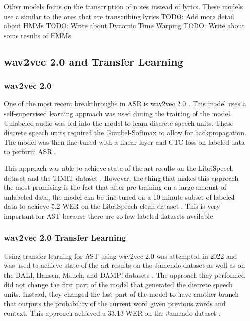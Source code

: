 \documentclass[letterpaper, 12pt]{article}
\begin{document}
\begin{multicols*}{2}
{
\color{red}
Other models focus on the transcription of notes instead of lyrics. These models use a similar
to the ones that are transcribing lyrics
TODO: Add more detail about HMMs
TODO: Write about Dynamic Time Warping
TODO: Write about some results of HMMs
}


\subsection{wav2vec 2.0 and Transfer Learning} \label{sec:wav2vec}

\subsubsection{wav2vec 2.0}
One of the most recent breakthroughs in ASR is wav2vec 2.0 \citep{wav2vec}. This model uses a
self-supervised learning approach was used during the training of the model. Unlabeled audio was
fed into the model to learn discrete speech units. These discrete speech units required the
Gumbel-Softmax \citep{gumbelSoftmax} to allow for backpropagation. The model was then
fine-tuned with a linear layer and CTC loss on labeled data to perform ASR \citep{wav2vec}.

This approach was able to achieve state-of-the-art results on the LibriSpeech dataset \citep{Librispeech}
and the TIMIT dataset \citep{TIMIT}. However, the thing that makes this approach the most promising
is the fact that after pre-training on a large amount of unlabeled data, the model can be fine-tuned
on a 10 minute subset of labeled data to achieve 5.2 WER on the LibriSpeech clean dataset \citep{wav2vec}.
This is very important for AST because there are so few labeled datasets available.

\subsubsection{wav2vec 2.0 Transfer Learning}
Using transfer learning for AST using wav2vec 2.0 was attempted in 2022 and was used to achieve
state-of-the-art results on the Jamendo dataset as well as on the DALI, Hansen, Mauch,
and DAMP! datasets \citep{wav2vecTransfer}. The approach they performed did not change the first part
of the model that generated the discrete speech units. Instead, they changed the last part of the
model to have another branch that outputs the probability of the current word given previous words
and context. This approach achieved a 33.13 WER on the Jamendo dataset \citep{wav2vecTransfer}.


\end{multicols*}
\end{document}
